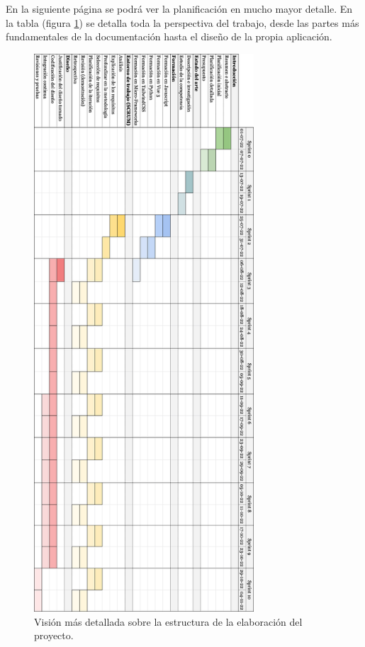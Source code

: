 En la siguiente página se podrá ver la planificación en mucho mayor detalle. En la tabla (figura \ref{gfx:plan-detallado}) se detalla toda la perspectiva del trabajo, desde las partes más fundamentales de la documentación hasta el diseño de la propia aplicación.

\begin{figure}[hbtp]

    \myfloatalign
    \includegraphics[width=0.73\textwidth]{gfx/plan-detallado.png}
    \caption[Planificación detallada del proyecto.]{Visión más detallada sobre la estructura de la elaboración del proyecto.}\label{gfx:plan-detallado}

\end{figure}

